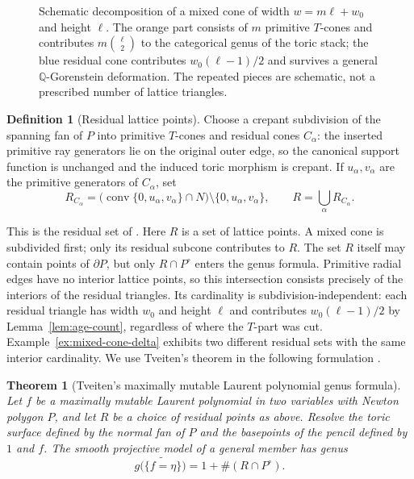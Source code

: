 \documentclass[11pt]{article}
\theoremstyle{plain}
\newtheorem*{citedtheorem}{Theorem}
\theoremstyle{definition}
\newtheorem{definition}[theorem]{Definition}
\theoremstyle{remark}
\newcommand{\Q}{\mathbb Q}
\newcommand{\1}{\mathbf 1}
\begin{document}
\begin{figure}[htbp]
\centering

\caption{Schematic decomposition of a mixed cone of width $w=m\ell+w_0$ and height $\ell$.  The orange part consists of $m$ primitive $T$-cones and contributes $m\binom{\ell}{2}$ to the categorical genus of the toric stack; the blue residual cone contributes $w_0(\ell-1)/2$ and survives a general $\Q$-Gorenstein deformation.  The repeated pieces are schematic, not a prescribed number of lattice triangles.}
\label{fig:mixed-cone-schematic}
\end{figure}

\begin{definition}[Residual lattice points]\label{def:residual-lattice-points}
Choose a crepant subdivision of the spanning fan of $P$ into primitive $T$-cones and residual cones $C_\alpha$: the inserted primitive ray generators lie on the original outer edge, so the canonical support function is unchanged and the induced toric morphism is crepant.  If $u_\alpha,v_\alpha$ are the primitive generators of $C_\alpha$, set
\[
R_{C_\alpha}
=\bigl(\operatorname{conv}\{0,u_\alpha,v_\alpha\}\cap N\bigr)
\setminus\{0,u_\alpha,v_\alpha\},
\qquad R=\bigcup_\alpha R_{C_\alpha}.
\]
\end{definition}
This is the residual set of \cite[Definitions 3.5--3.6]{CKPT}.  Here $R$ is a set of lattice points.  A mixed cone is subdivided first; only its residual subcone contributes to $R$.  The set $R$ itself may contain points of $\partial P$, but only $R\cap P^\circ$ enters the genus formula.  Primitive radial edges have no interior lattice points, so this intersection consists precisely of the interiors of the residual triangles.  Its cardinality is subdivision-independent: each residual triangle has width $w_0$ and height $\ell$ and contributes $w_0(\ell-1)/2$ by Lemma~\ref{lem:age-count}, regardless of where the $T$-part was cut.  Example~\ref{ex:mixed-cone-delta} exhibits two different residual sets with the same interior cardinality.  We use Tveiten's theorem \cite[Theorem 3.13]{Tveiten} in the following formulation \cite[Theorem 3.13]{CKPT}.

\begin{citedtheorem}[Tveiten's maximally mutable Laurent polynomial genus formula]
Let $f$ be a maximally mutable Laurent polynomial in two variables with Newton polygon $P$, and let $R$ be a choice of residual points as above.  Resolve the toric surface defined by the normal fan of $P$ and the basepoints of the pencil defined by $1$ and $f$.  The smooth projective model of a general member has genus
\[
g\bigl(\widetilde{\{f=\eta\}}\bigr)=1+\#(R\cap P^\circ).
\]
\end{citedtheorem}
\end{document}
